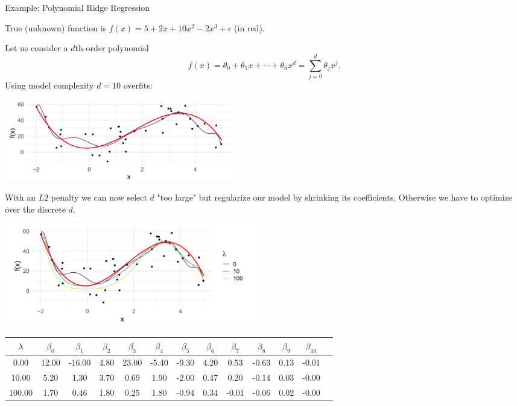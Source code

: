 \begin{vbframe}{Example: Polynomial Ridge Regression}

True (unknown) function is \(f(x) = 5 + 2x +10x^2 - 2x^3 + \epsilon\) (in red).

\lz

Let us consider a \(d\)th-order polynomial
\[ f(x) = \theta_0 + \theta_1 x + \cdots + \theta_d x^d = \sum_{j = 0}^{d} \theta_j x^j\text{.} \]
Using model complexity $d = 10$ overfits:

\begin{center}
\includegraphics[width = 10cm ]{figure_man/poly-ridge.png} \\
\end{center}

\framebreak

With an $L2$ penalty we can now select $d$ "too large" but regularize our model by shrinking its coefficients. Otherwise we have to optimize over the discrete $d$.

\vfill

\begin{center}
\includegraphics[width = 11cm ]{figure_man/poly-ridge02.png} \\
\end{center}


\begin{center}
\tiny
\begin{tabular}{ c| c c c c c c c c c c c c}
 $\lambda$ & $\beta_0$ & $\beta_1$ & $\beta_2$ & $\beta_3$ & $\beta_4$ & $\beta_5$ & $\beta_6$ & $\beta_7$ & $\beta_8$ & $\beta_9$ & $\beta_{10}$ \\
 \hline
 0.00 & 12.00 & -16.00 & 4.80 & 23.00 & -5.40 & -9.30 & 4.20 & 0.53 & -0.63 & 0.13 & -0.01 \\
 10.00 & 5.20 &1.30 & 3.70 & 0.69 & 1.90 & -2.00 & 0.47 & 0.20 & -0.14 & 0.03 & -0.00 \\
 100.00 & 1.70 & 0.46 & 1.80 & 0.25 & 1.80 & -0.94 & 0.34 & -0.01 & -0.06 & 0.02 & -0.00
\end{tabular}
\end{center}


\end{vbframe}

